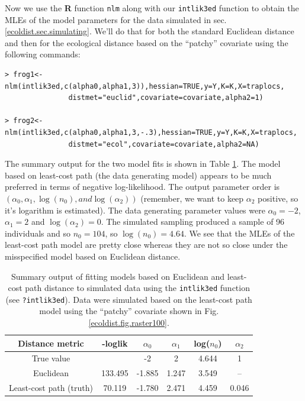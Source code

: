 Now we use the {\bf R} function \mbox{\tt nlm} along with
our \mbox{\tt intlik3ed} function to  obtain the MLEs of the
model parameters for the data simulated
in sec. \ref{ecoldist.sec.simulating}.
 We'll do that for both the standard Euclidean distance
and then for the ecological distance based on the ``patchy''
covariate using the following commands:
{\small
 \begin{verbatim}
> frog1<-nlm(intlik3ed,c(alpha0,alpha1,3)),hessian=TRUE,y=Y,K=K,X=traplocs,
               distmet="euclid",covariate=covariate,alpha2=1)

> frog2<-nlm(intlik3ed,c(alpha0,alpha1,3,-.3),hessian=TRUE,y=Y,K=K,X=traplocs,
               distmet="ecol",covariate=covariate,alpha2=NA)
\end{verbatim}
}
The summary output for the two model fits is shown in Table \ref{ecoldist.tab.results1}.
The model based on least-cost path (the data generating model) appears
to be much preferred in terms of negative log-likelihood.
The output parameter order is $(\alpha_{0}, \alpha_{1}, \log(n_{0}), and
\log(\alpha_{2}))$ (remember, we want to keep $\alpha_{2}$
positive, so it's logarithm is estimated).
The data generating parameter values were
$\alpha_{0} = - 2$,
$\alpha_{1} = 2$ and $\log(\alpha_{2}) = 0$.
The simulated sampling produced a sample of 96 individuals and so
$n_{0} = 104$, so $\log(n_{0}) = 4.64$. We see that the
 MLEs of the least-cost path model are pretty close whereas they are
 not so close under the misspecified model based on Euclidean distance.



\begin{table}
\caption{
Summary output of fitting models based on Euclidean and least-cost
path distance to simulated data using the
 \mbox{\tt intlik3ed} function (see \mbox{\tt ?intlik3ed}). Data were
 simulated based on the least-cost path model using the ``patchy''
 covariate shown in Fig. \ref{ecoldist.fig.raster100}.
}
\begin{tabular}{cccccc} \hline \hline
Distance metric &  -loglik &     $\alpha_0$  & $\alpha_1$  &\mbox{log}($n_{0}$) &  $\alpha_2$ \\ \hline
True value      &          &         -2      &    2       &   4.644 & 1 \\
Euclidean   &133.495&  -1.885 &    1.247 &    3.549 &      -- \\
Least-cost path (truth) & 70.119& -1.780 &  2.471    &    4.459 &
0.046  \\ \hline
\end{tabular}
\label{ecoldist.tab.results1}
\end{table}






